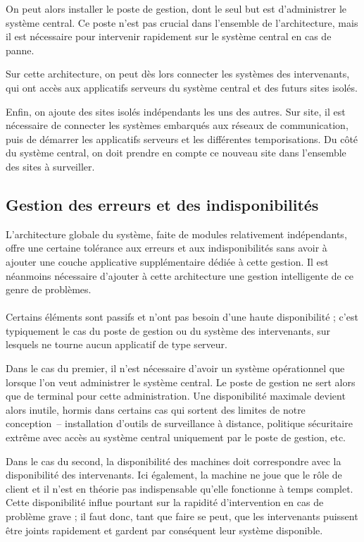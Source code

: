 \documentclass[a4paper, 11pt, final]{article}
\begin{document}
On peut alors installer le poste de gestion, dont le seul but est
d'administrer le système central. Ce poste n'est pas crucial dans
l'ensemble de l'architecture, mais il est nécessaire pour intervenir
rapidement sur le système central en cas de panne.

Sur cette architecture, on peut dès lors connecter les systèmes des
intervenants, qui ont accès aux applicatifs serveurs du système
central et des futurs sites isolés.

Enfin, on ajoute des sites isolés indépendants les uns des autres. Sur
site, il est nécessaire de connecter les systèmes embarqués aux
réseaux de communication, puis de démarrer les applicatifs serveurs et
les différentes temporisations. Du côté du système central, on doit
prendre en compte ce nouveau site dans l'ensemble des sites à
surveiller.

\subsection{Gestion des erreurs et des indisponibilités}
\label{subsection:erreurs_et_indisponibilites}
L'architecture globale du système, faite de modules relativement
indépendants, offre une certaine tolérance aux erreurs et aux
indisponibilités sans avoir à ajouter une couche applicative
supplémentaire dédiée à cette gestion. Il est néanmoins nécessaire
d'ajouter à cette architecture une gestion intelligente de ce genre de
problèmes.

\paragraph{}
Certains éléments sont passifs et n'ont pas besoin d'une haute
disponibilité ; c'est typiquement le cas du poste de gestion ou du
système des intervenants, sur lesquels ne tourne aucun applicatif de
type serveur.

Dans le cas du premier, il n'est nécessaire d'avoir un système
opérationnel que lorsque l'on veut administrer le système central. Le
poste de gestion ne sert alors que de terminal pour cette
administration. Une disponibilité maximale devient alors inutile,
hormis dans certains cas qui sortent des limites de notre
conception~-- installation d'outils de surveillance à distance,
politique sécuritaire extrême avec accès au système central uniquement
par le poste de gestion, etc.

Dans le cas du second, la disponibilité des machines doit correspondre
avec la disponibilité des intervenants. Ici également, la machine ne
joue que le rôle de client et il n'est en théorie pas indispensable
qu'elle fonctionne à temps complet. Cette disponibilité influe
pourtant sur la rapidité d'intervention en cas de problème grave ; il
faut donc, tant que faire se peut, que les intervenants puissent être
joints rapidement et gardent par conséquent leur système disponible.
\end{document}
